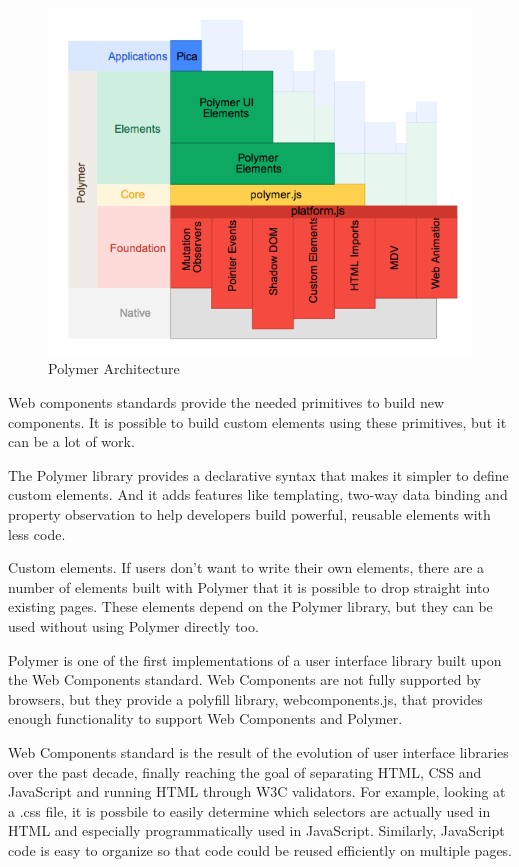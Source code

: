 \begin {figure}[h]
\graphicspath{{images/chapter_TCH/}}
\includegraphics[width=\textwidth]{polymer_1}
\caption{Polymer Architecture}
\end {figure}
 

Web components standards provide the needed primitives to build new components. It is possible to build custom elements using these primitives, but it can be a lot of work.

The Polymer library provides a declarative syntax that makes it simpler to define custom elements. And it adds features like templating, two-way data binding and property observation to help developers build powerful, reusable elements with less code.

Custom elements. If users don’t want to write their own elements, there are a number of elements built with Polymer that it is possible to drop straight into existing pages. These elements depend on the Polymer library, but they can be used without using Polymer directly too.\cite{tch_polymer1}

Polymer is one of the first implementations of a user interface library built upon the Web Components standard.  Web Components are not fully supported by browsers, but they provide a polyfill library, webcomponents.js, that provides enough functionality to support Web Components and Polymer.

Web Components standard is the result of the evolution of user interface libraries over the past decade, finally reaching the goal of separating HTML, CSS and JavaScript and running HTML through W3C validators. For example, looking at a .css file, it is possbile to easily determine which selectors are actually used in HTML and especially programmatically used in JavaScript.  Similarly, JavaScript code is easy to organize so that code could be reused efficiently on multiple pages.\cite{tch_polymer2}

